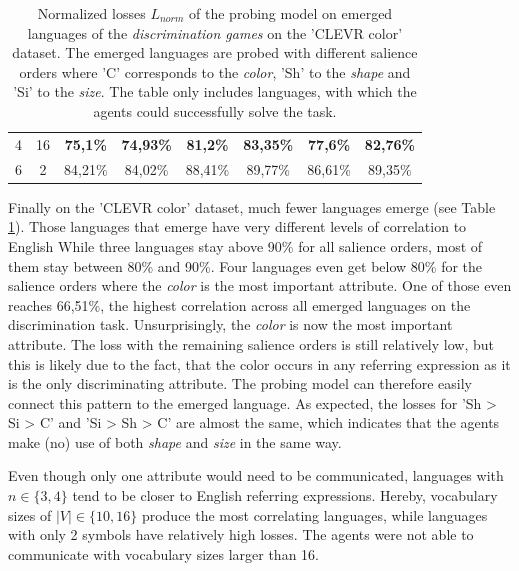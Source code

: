 \begin{table}[ht]
\begin{tabular}{cc|c|c|c|c|c|c}
        {4} & {16}  & \textbf{75,1\%}          & \textbf{74,93\%}         & \textbf{81,2\%}          & \textbf{83,35\%}         & \textbf{77,6\%}          & \textbf{82,76\%}         \\
        {6} & {2}   & {84,21\%}                & {84,02\%}                & {88,41\%}                & {89,77\%}                & {86,61\%}                & {89,35\%}                \\
        \bottomrule
    \end{tabular}
    \caption{Normalized losses $L_{norm}$ of the probing model on emerged languages of the \emph{discrimination games} on the 'CLEVR color' dataset. The emerged languages are probed with different salience orders where 'C' corresponds to the \emph{color}, 'Sh' to the \emph{shape} and 'Si' to the \emph{size}. The table only includes languages, with which the agents could successfully solve the task.}
    \label{tab:probing:discriminator:colour}
\end{table}

Finally on the 'CLEVR color' dataset, much fewer languages emerge (see Table \ref{tab:probing:discriminator:colour}).
Those languages that emerge have very different levels of correlation to English
While three languages stay above 90\% for all salience orders, most of them stay between 80\% and 90\%.
Four languages even get below 80\% for the salience orders where the \emph{color} is the most important attribute.
One of those even reaches 66,51\%, the highest correlation across all emerged languages on the discrimination task.
Unsurprisingly, the \emph{color} is now the most important attribute.
The loss with the remaining salience orders is still relatively low, but this is likely due to the fact, that the color occurs in any referring expression as it is the only discriminating attribute.
The probing model can therefore easily connect this pattern to the emerged language.
As expected, the losses for 'Sh > Si > C' and 'Si > Sh > C' are almost the same, which indicates that the agents make (no) use of both \emph{shape} and \emph{size} in the same way.

Even though only one attribute would need to be communicated, languages with $n \in \{3,4\}$ tend to be closer to English referring expressions.
Hereby, vocabulary sizes of $|V| \in \{10,16\}$ produce the most correlating languages, while languages with only 2 symbols have relatively high losses.
The agents were not able to communicate with vocabulary sizes larger than 16.


